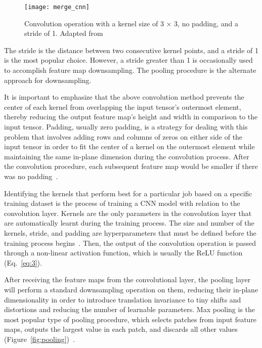 \begin{figure}[htbp]
    \centering
    \texttt{[image: merge\_cnn]}
    \caption{Convolution operation with a kernel size of 3 × 3, no padding, and a stride of 1. Adapted from~\cite{Yamashita2018ConvolutionalRadiology}}
    \label{fig:merge_cnn}
\end{figure}

The stride is the distance between two consecutive kernel points, and a stride of 1 is the most popular choice. However, a stride greater than 1 is occasionally used to accomplish feature map downsampling. The pooling procedure is the alternate approach for downsampling.

It is important to emphasize that the above convolution method prevents the center of each kernel from overlapping the input tensor's outermost element, thereby reducing the output feature map's height and width in comparison to the input tensor. Padding, usually zero padding, is a strategy for dealing with this problem that involves adding rows and columns of zeros on either side of the input tensor in order to fit the center of a kernel on the outermost element while maintaining the same in-plane dimension during the convolution process. After the convolution procedure, each subsequent feature map would be smaller if there was no padding~\cite{Yamashita2018ConvolutionalRadiology}.

Identifying the kernels that perform best for a particular job based on a specific training dataset is the process of training a \gls{CNN} model with relation to the convolution layer. Kernels are the only parameters in the convolution layer that are automatically learnt during the training process. The size and number of the kernels, stride, and padding are hyperparameters that must be defined before the training process begins~\cite{Yamashita2018ConvolutionalRadiology}. Then, the output of the convolution operation is passed through a non-linear activation function, which is usually the ReLU function (Eq.~\ref{eq:3}). 

After receiving the feature maps from the convolutional layer, the pooling layer will perform a standard downsampling operation on them, reducing their in-plane dimensionality in order to introduce translation invariance to tiny shifts and distortions and reducing the number of learnable parameters. Max pooling is the most popular type of pooling procedure, which selects patches from input feature maps, outputs the largest value in each patch, and discards all other values (Figure~\ref{fig:pooling})~\cite{Yamashita2018ConvolutionalRadiology}.

